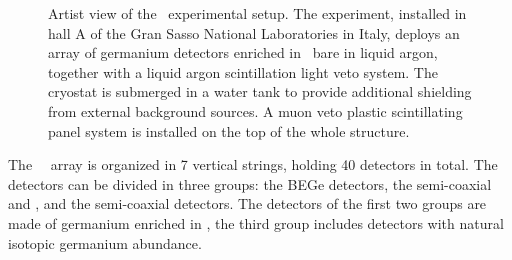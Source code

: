 \begin{figure}
  \centering
  \caption{%
    Artist view of the \gerda\ experimental setup. The experiment, installed in hall A of
    the Gran Sasso National Laboratories in Italy, deploys an array of germanium detectors
    enriched in \gesix\ bare in liquid argon, together with a liquid argon scintillation
    light veto system. The cryostat is submerged in a water tank to provide additional
    shielding from external background sources. A muon veto plastic scintillating panel
    system is installed on the top of the whole structure.
  }\label{fig:setup:artistview}
\end{figure}

The \gerda\ \phasetwo\ array is organized in 7 vertical strings, holding 40 detectors in
total. The detectors can be divided in three groups: the BEGe detectors, the semi-coaxial
 and , and the semi-coaxial  detectors. The detectors of the first two
groups are made of germanium enriched in \gesix, the third group includes detectors with
natural isotopic germanium abundance.

